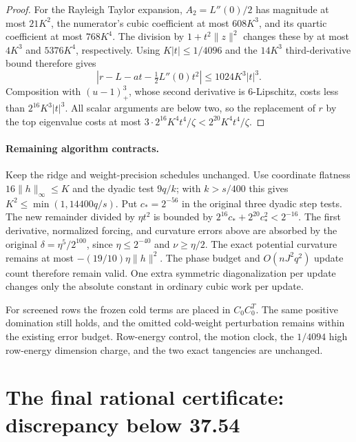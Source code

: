 \documentclass[11pt]{amsart}
\theoremstyle{remark}\newtheorem{remark}[theorem]{Remark}
\begin{document}
\begin{proof}
For the Rayleigh Taylor expansion, $A_2=L''(0)/2$ has magnitude at most
$21K^2$, the numerator's cubic coefficient at most $608K^3$, and its
quartic coefficient at most $768K^4$. The division by
$1+t^2\|z\|^2$ changes these by at most $4K^3$ and $5376K^4$,
respectively. Using $K|t|\le1/4096$ and the $14K^3$ third-derivative bound
therefore gives
\[
 |r-L-at-\tfrac12L''(0)t^2|\le1024K^3|t|^3.
\]
Composition with $(u-1)_+^3$, whose second derivative is 6-Lipschitz,
costs less than $2^{16}K^3|t|^3$. All scalar arguments are below two,
so the replacement of $r$ by the top eigenvalue costs at most
$3\cdot2^{16}K^4t^4/\zeta<2^{20}K^4t^4/\zeta$.
\end{proof}

\paragraph{Remaining algorithm contracts.}
Keep the ridge and weight-precision schedules unchanged. Use coordinate
flatness $16\|h\|_\infty\le K$ and the dyadic test $9q/k$; with
$k>s/400$ this gives $K^2\le\min(1,14400q/s)$.
Put $c_*=2^{-56}$ in the original three dyadic step tests.
The new remainder divided by $\eta t^2$ is bounded by
$2^{16}c_*+2^{20}c_*^2<2^{-16}$.
The first derivative, normalized forcing, and curvature errors above are
absorbed by the original $\delta=\eta^5/2^{100}$, since $\eta\le2^{-40}$
and $\nu\ge\eta/2$.
The exact potential curvature remains at most
$-(19/10)\eta\|h\|^2$. The phase budget and $O(nJ^2q^2)$ update count
therefore remain valid. One extra symmetric diagonalization per update
changes only the absolute constant in ordinary cubic work per update.

For screened rows the frozen cold terms are placed in $C_0C_0^T$.
The same positive domination still holds, and the omitted cold-weight
perturbation remains within the existing error budget. Row-energy
control, the motion clock, the $1/4094$ high row-energy dimension charge,
and the two exact tangencies are unchanged.
\section{The final rational certificate: discrepancy below 37.54}
\label{sec:finalparameters}
\end{document}
